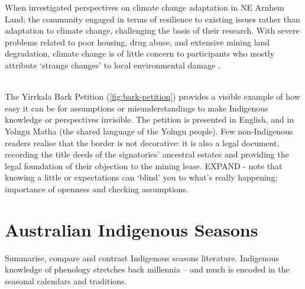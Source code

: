 
When \citet{petheram2010} investigated perspectives on climate change
adaptation in NE Arnhem Land; the community engaged in terms of resilience to
existing issues rather than adaptation to climate change, challenging the basis
of their research.  With severe problems related to poor housing, drug abuse,
and extensive mining land degradation, climate change is of little concern to
participants who mostly attribute `strange changes' to local environmental
damage \citep{green2010a}.

~\\

The Yirrkala Bark Petition (\cref{fig:bark-petition}) provides a visible
example of how easy it can be for assumptions or misunderstandings to make
Indigenous knowledge or perspectives invisible.  The petition is presented
in English, and in Yolngu Matha (the shared language of the Yolngu people).
Few non-Indigenous readers realise that the border is not decorative: it is
also a legal document, recording the title deeds of the signatories' ancestral
estates and providing the legal foundation of their objection to the mining
lease.
%
EXPAND - note that knowing a little or expectations can `blind' you to
what's really happening; importance of openness and checking assumptions.




\section{Australian Indigenous Seasons}

Summarise, compare and contrast Indigenous seasons literature.
Indigenous knowledge of phenology stretches back millennia – and much is
encoded in the seasonal calendars and traditions.\\


